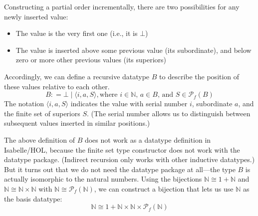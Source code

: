 Constructing a partial order incrementally, there are two possibilities for any newly inserted value:
%
\begin{itemize}
\item The value is the very first one (i.e., it is $\bot$)
\item The value is inserted above some previous value (its subordinate), and below zero or more other previous values (its superiors)
\end{itemize}
%
Accordingly, we can define a recursive datatype $B$ to describe the position of these values relative to each other.
%
\begin{equation}
B \mathrel{\mathop:}= \bot \mid \langle i, a, S\rangle, \mbox{where $i \in \mathbb{N}$, $a \in B$, and $S \in \mathcal{P}_f(B)$}
\end{equation}
%
The notation $\langle i, a, S\rangle$ indicates the value with serial number $i$, subordinate $a$, and the finite set of superiors $S$. (The serial number allows us to distinguish between subsequent values inserted in similar positions.)

The above definition of $B$ does not work as a datatype definition in Isabelle{\slash}HOL, because the finite set type constructor does not work with the datatype package. (Indirect recursion only works with other inductive datatypes.)  But it turns out that we do not need the datatype package at all---the type $B$ is actually isomorphic to the natural numbers. Using the bijections $\mathbb{N} \cong 1 + \mathbb{N}$ and $\mathbb{N} \cong \mathbb{N} \times \mathbb{N}$ with $\mathbb{N} \cong \mathcal{P}_f(\mathbb{N})$, we can construct a bijection that lets us use $\mathbb{N}$ as the basis datatype:
%
\begin{equation}
\mathbb{N} \cong
  1 + \mathbb{N} \times \mathbb{N} \times \mathcal{P}_f(\mathbb{N})
\end{equation}

